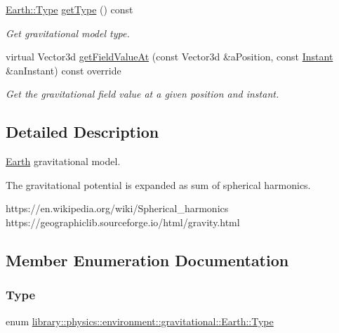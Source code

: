\begin{DoxyCompactItemize}
\hyperlink{classlibrary_1_1physics_1_1environment_1_1gravitational_1_1_earth_ab20a2b260831c66ac10f7b9a307d25ca}{Earth\+::\+Type} \hyperlink{classlibrary_1_1physics_1_1environment_1_1gravitational_1_1_earth_aa3297aab7cd635ace4a33c1ffee39673}{get\+Type} () const
\begin{DoxyCompactList}\small\item\em Get gravitational model type. \end{DoxyCompactList}\item 
virtual Vector3d \hyperlink{classlibrary_1_1physics_1_1environment_1_1gravitational_1_1_earth_a493e78b74deb178fcbed8eff70adb390}{get\+Field\+Value\+At} (const Vector3d \&a\+Position, const \hyperlink{classlibrary_1_1physics_1_1time_1_1_instant}{Instant} \&an\+Instant) const override
\begin{DoxyCompactList}\small\item\em Get the gravitational field value at a given position and instant. \end{DoxyCompactList}\end{DoxyCompactItemize}


\subsection{Detailed Description}
\hyperlink{classlibrary_1_1physics_1_1environment_1_1gravitational_1_1_earth}{Earth} gravitational model. 

The gravitational potential is expanded as sum of spherical harmonics.

https\+://en.wikipedia.\+org/wiki/\+Spherical\+\_\+harmonics https\+://geographiclib.sourceforge.\+io/html/gravity.html 

\subsection{Member Enumeration Documentation}
\mbox{\label{classlibrary_1_1physics_1_1environment_1_1gravitational_1_1_earth_ab20a2b260831c66ac10f7b9a307d25ca}} 
\subsubsection{\texorpdfstring{Type}{Type}}
{\footnotesize\ttfamily enum \hyperlink{classlibrary_1_1physics_1_1environment_1_1gravitational_1_1_earth_ab20a2b260831c66ac10f7b9a307d25ca}{library\+::physics\+::environment\+::gravitational\+::\+Earth\+::\+Type}\hspace{0.3cm}{\ttfamily [strong]}}

